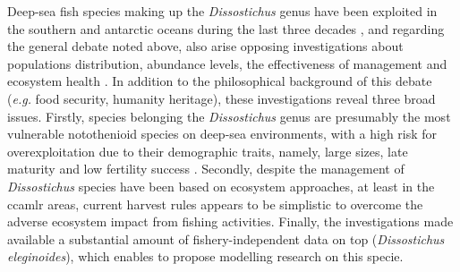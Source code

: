 Deep-sea fish species making up the \emph{Dissostichus} genus have been exploited in the southern and antarctic oceans during the last three decades \citep{FAO2014}, and regarding the general debate noted above, also arise opposing investigations about populations distribution, abundance levels, the effectiveness of management and ecosystem health \citep{Constable2000778,csiro2001,eltit2007,Hoshino2010265,Norse2012,Candy2011,Abrams2013,Ainley2013a,Ainley2013,Ziegler2014}. In addition to the philosophical background of this debate (\emph{e.g.} food security, humanity heritage), these investigations reveal three broad issues. Firstly, species belonging the \emph{Dissostichus} genus are presumably the most vulnerable notothenioid species on deep-sea environments, with a high risk for overexploitation due to their demographic traits, namely, large sizes, late maturity and low fertility success \citep[see][]{Collins2010230}. Secondly, despite the management of \emph{Dissostichus} species have been based on ecosystem approaches, at least in the \ac{ccamlr} areas, current harvest rules appears to be simplistic to overcome the adverse ecosystem impact from fishing activities. Finally, the investigations made available a substantial amount of fishery-independent data on \acl{top} (\emph{Dissostichus eleginoides}), which enables to propose modelling research on this specie.

